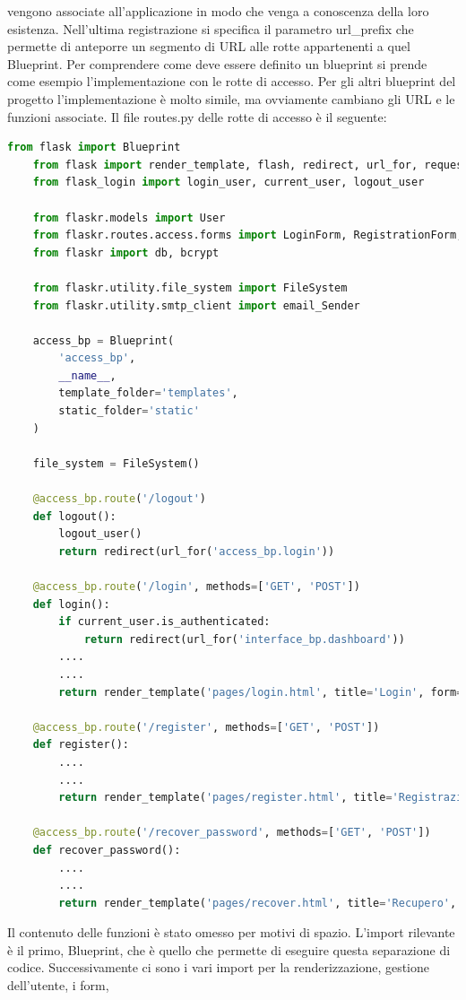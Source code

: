 vengono associate all'applicazione in modo che venga a conoscenza della loro esistenza.
Nell'ultima registrazione si specifica il parametro url\_prefix che permette di anteporre 
un segmento di URL alle rotte appartenenti a quel Blueprint.\newline
\newline
Per comprendere come deve essere definito un blueprint si prende come esempio l'implementazione con le rotte di accesso.
Per gli altri blueprint del progetto l'implementazione è molto simile, 
ma ovviamente cambiano gli URL e le funzioni associate.
\hypertarget{lst:flask-creazione-blueprint-access}{Il file routes.py delle rotte di accesso è il seguente:}
\begin{lstlisting}[language=python]
	from flask import Blueprint
	from flask import render_template, flash, redirect, url_for, request
	from flask_login import login_user, current_user, logout_user
	
	from flaskr.models import User
	from flaskr.routes.access.forms import LoginForm, RegistrationForm, RecoverPasswordForm
	from flaskr import db, bcrypt
	
	from flaskr.utility.file_system import FileSystem
	from flaskr.utility.smtp_client import email_Sender
	
	access_bp = Blueprint(
		'access_bp',
		__name__,
		template_folder='templates',
		static_folder='static'
	)
	
	file_system = FileSystem()
	
	@access_bp.route('/logout')
	def logout():
		logout_user()
		return redirect(url_for('access_bp.login'))
	
	@access_bp.route('/login', methods=['GET', 'POST'])
	def login():
    	if current_user.is_authenticated:
        	return redirect(url_for('interface_bp.dashboard'))
		....
		....
		return render_template('pages/login.html', title='Login', form=form)
	
	@access_bp.route('/register', methods=['GET', 'POST'])
	def register():
		....
		....
		return render_template('pages/register.html', title='Registrazione', form=form)
	
	@access_bp.route('/recover_password', methods=['GET', 'POST'])
	def recover_password():
		....
		....
		return render_template('pages/recover.html', title='Recupero', form=form)
\end{lstlisting}
Il contenuto delle funzioni è stato omesso per motivi di spazio.
L'import rilevante è il primo, Blueprint, che è quello che permette di eseguire questa separazione di codice.
Successivamente ci sono i vari import per la renderizzazione, gestione dell'utente, i form, 
